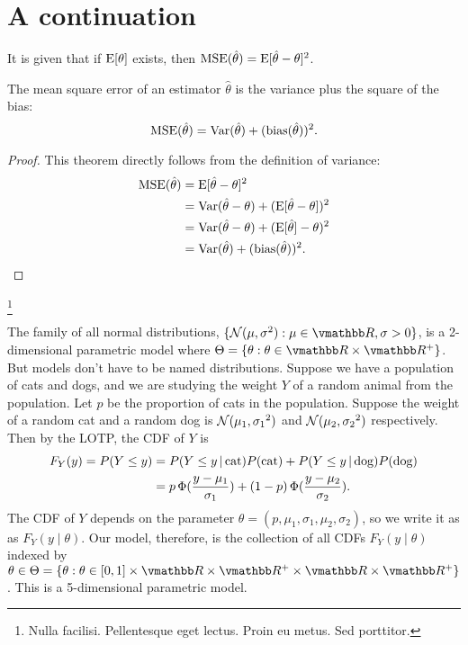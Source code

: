 \documentclass[]{notes}
\begin{document}
  \section{A continuation}
  \lipsum[8]
  \begin{proposition}
    It is given that if $\operatorname{E}[\theta]$ exists, then $\operatorname{MSE}(\hat\theta) = \operatorname{E}[\hat\theta - \theta]^2$.
  \end{proposition}
  \begin{theorem}[Theorem]
    The mean square error of an estimator $\hat\theta$ is the variance plus the square of the bias: $$\operatorname{MSE}(\hat\theta) = \operatorname{Var}(\hat\theta) + (\operatorname{bias}(\hat\theta))^2.$$
  \end{theorem}
  \begin{proof} This theorem directly follows from the definition of variance:
    \begin{align*}
      \operatorname{MSE}(\hat\theta) &= \operatorname{E}[\hat\theta - \theta]^2 \\
                       &= \operatorname{Var}(\hat\theta - \theta) + (\operatorname{E}[\hat\theta - \theta])^2 \\
                       &= \operatorname{Var}(\hat\theta - \theta) + (\operatorname{E}[\hat\theta] - \theta)^2 \\
                       &= \operatorname{Var}(\hat\theta) + (\operatorname{bias}(\hat\theta))^2.
    \end{align*}
  \end{proof}
  \lipsum[9]\footnote{Nulla facilisi. Pellentesque eget lectus. Proin eu metus. Sed porttitor.}
  \begin{example}
    The family of all normal distributions, $\{\N(\mu, \sigma^2) : \mu \in \R, \sigma > 0\}$, is a 2-dimensional parametric model where $\Theta = \{\theta : \theta \in \R \times \R^+\}$. But models don't have to be named distributions. Suppose we have a population of cats and dogs, and we are studying the weight $Y$ of a random animal from the population. Let $p$ be the proportion of cats in the population. Suppose the weight of a random cat and a random dog is $\mathcal N(\mu_1, {\sigma_1}^2)$ and $\mathcal N(\mu_2, {\sigma_2}^2)$ respectively. Then by the LOTP, the CDF of $Y$ is 
    \begin{align*}
      F_Y(y) = P(Y \leq y) &= P(Y \leq y \,|\, \text{cat})P(\text{cat}) + P(Y \leq y \,|\, \text{dog})P(\text{dog}) \\
                          &= p\,\Phi(\frac{y - \mu_1}{\sigma_1}) + (1-p)\,\Phi(\frac{y - \mu_2}{\sigma_2}).
    \end{align*}
    The CDF of $Y$ depends on the parameter $\theta = (p, \mu_1, \sigma_1, \mu_2, \sigma_2)$, so we write it as as $F_Y(y \mid \theta)$. Our model, therefore, is the collection of all CDFs $F_Y(y \mid \theta)$ indexed by $\theta \in \Theta =\{\theta : \theta \in [0, 1] \times \R \times \R^+ \times \R \times \R^+\}$. This is a 5-dimensional parametric model.
  \end{example}
\end{document}
